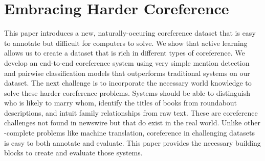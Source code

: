 
\section{Embracing Harder Coreference}
\label{sec:conclusion}

This paper introduces a new, naturally-occuring coreference dataset
that is easy to annotate but difficult for computers to solve. We show that active learning allows us to create a dataset that is rich in different types of coreference. We develop an end-to-end coreference system using very simple mention detection and pairwise classification models that outperforms traditional systems on our dataset.
The next challenge is to incorporate the necessary world knowledge to
solve these harder coreference problems. Systems should be able to
distinguish who is likely to marry whom, identify the titles of books from
roundabout descriptions, and intuit family relationships from raw
text. These are coreference challenges not found in newswire but that
do exist in the real world. Unlike other -complete problems like machine translation,
coreference in challenging datasets is easy to both annotate and
evaluate. This paper provides the necessary building blocks to create
and evaluate those systems.
